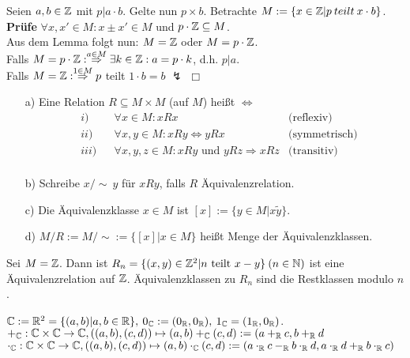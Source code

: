 \begin{bew}
	Seien $a,b\in\mathbb{Z}$ mit $p|a\cdot b$. Gelte nun $p\times b$. Betrachte $M:=\{x\in\mathbb{Z}|p\:teilt\:x\cdot b\}$. \\
	\textbf{Prüfe} $\forall x,x'\in M:x\pm x'\in M$ und $p\cdot\mathbb{Z}\subseteq M$.\\
	Aus dem Lemma folgt nun: $M=\mathbb{Z}$ oder $M=p\cdot\mathbb{Z}$.\\
	Falls $M=p\cdot\mathbb{Z}:\stackrel{a\in M}{\Rightarrow}\exists k\in\mathbb{Z}:a=p\cdot k$, d.h. $p|a$.\\
	Falls $M=\mathbb{Z}:\stackrel{1\in M}{\Rightarrow} p$ teilt $1\cdot b=b$ $\lightning$ \hfill $\Box$\\
\end{bew}

\begin{defi}
	\begin{itemize}
		\item[]
		\item[a)] Eine Relation $R\subseteq M\times M$ (auf $M$) heißt  $\Leftrightarrow$
		\begin{align*}
		& i) && \forall x\in M: xRx & \text{(reflexiv)} \\
		& ii) && \forall x,y\in M: xRy\Leftrightarrow yRx & \text{(symmetrisch)} \\
		& iii) && \forall x,y,z\in M: xRy\text{ und }yRz\Rightarrow xRz & \text{(transitiv)} \\
		\end{align*}
		\item[b)] Schreibe $x/\sim\:y$ für $xRy$, falls $R$ Äquivalenzrelation.  %
		\item[c)] Die Äquivalenzklasse $x\in M$ ist $[x]:=\{y\in M|x\tilde y\}$.
		\item[d)] $M/R:=M/\sim:=\{[x]|x\in M\}$ heißt Menge der Äquivalenzklassen.
	\end{itemize}
\end{defi}

\begin{bsp}
	Sei $M=\mathbb{Z}$. Dann ist $R_{n}=\{(x,y)\in\mathbb{Z}^{2}|n\text{ teilt }x-y\}\:(n\in\mathbb{N})$ ist eine Äquivalenzrelation auf $\mathbb{Z}$. Äquivalenzklassen zu $R_{n}$ sind die Restklassen modulo $n$.
\end{bsp}

\begin{defi}
	$\mathbb{C}:=\mathbb{R}^{2}=\{(a,b)|a,b\in\mathbb{R}\},\:0_{\mathbb{C}}:=(0_{\mathbb{R}},0_{\mathbb{R}}),\:1_{\mathbb{C}}=(1_{\mathbb{R}},0_{\mathbb{R}})$. \\ $+_{\mathbb{C}}:\mathbb{C}\times\mathbb{C}\rightarrow\mathbb{C},((a,b),(c,d))\mapsto(a,b)+_{\mathbb{C}}(c,d):=(a+_{\mathbb{R}}c,b+_{\mathbb{R}}d$\\
	$\cdot_{\mathbb{C}}:\mathbb{C}\times\mathbb{C}\rightarrow\mathbb{C},((a,b),(c,d))\mapsto(a,b)\cdot_{\mathbb{C}}(c,d):=(a\cdot_{\mathbb{R}}c-_{\mathbb{R}}b\cdot_{\mathbb{R}}d,a\cdot_{\mathbb{R}}d+_{\mathbb{R}}b\cdot_{\mathbb{R}}c)$
\end{defi}

